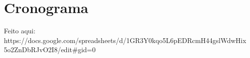\section{Cronograma}

Feito aqui: https://docs.google.com/spreadsheets/d/1GR3Y0kqo5L6pEDRcmH44gslWdwHix5o2ZnDbRJvO2I8/edit#gid=0